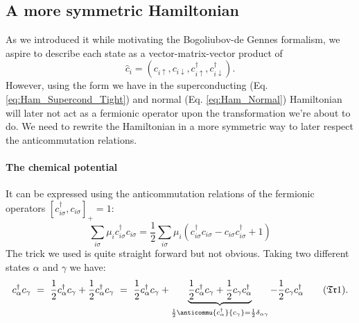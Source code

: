 \documentclass[../main.tex]{subfile}
\begin{document}
\subsection{A more symmetric Hamiltonian}
As we introduced it while motivating the Bogoliubov-de Gennes formalism, we aspire to describe each state as a vector-matrix-vector product of
\[
    \hat{c}_i = \left(c_{i\uparrow}, c_{i\downarrow},c_{i\uparrow}^{\dagger}, c_{i\downarrow}^{\dagger}\right).
\]
However, using the form we have in the superconducting (Eq. \ref{eq:Ham_Supercond_Tight}) and normal (Eq. \ref{eq:Ham_Normal}) 
Hamiltonian will later not act as a fermionic operator upon the transformation we're about to
do. We need to rewrite the Hamiltonian in a more symmetric way to later respect the anticommutation relations.\\

\paragraph{The chemical potential} $~$\\
It can be expressed using the anticommutation relations of the fermionic operators $[c_{i\sigma}^{\dagger},c_{i\sigma}]_+ = 1$:
\begin{equation}\label{eq:SymHam_muTerm}
    \sum_{i\sigma} \mu_i c_{i\sigma}^{\dagger} c_{i\sigma} = \frac{1}{2}\sum_{i\sigma} \mu_i \left(c_{i\sigma}^{\dagger}c_{i\sigma} - c_{i\sigma}c_{i\sigma}^{\dagger} + 1\right)
\end{equation}
The trick we used is quite straight forward but not obvious. Taking two different states $\alpha$ and $\gamma$ we have:
\begin{equation}\label{eq:Trick1}
    c^{\dagger}_{\alpha}c_{\gamma} ~=~ \frac{1}{2}c^{\dagger}_{\alpha}c_{\gamma} + \frac{1}{2}c^{\dagger}_{\alpha}c_{\gamma} ~=~ \frac{1}{2}c^{\dagger}_{\alpha}c_{\gamma} + \underbrace{\frac{1}{2}c^{\dagger}_{\alpha}c_{\gamma} + \frac{1}{2}c_{\gamma}c^{\dagger}_{\alpha}}_{\frac{1}{2}\anticommu{c^{\dagger}_{\alpha}}{c_{\gamma}} = \frac{1}{2}\delta_{\alpha\gamma}} - \frac{1}{2}c_{\gamma}c^{\dagger}_{\alpha} \tag{$\mathfrak{Tr}$1}. 
\end{equation}
\end{document}
